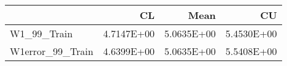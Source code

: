 \begin{tabular}{lrrr}
\toprule
{} &         CL &       Mean &         CU \\
\midrule
W1\_99\_Train      & 4.7147E+00 & 5.0635E+00 & 5.4530E+00 \\
W1error\_99\_Train & 4.6399E+00 & 5.0635E+00 & 5.5408E+00 \\
\bottomrule
\end{tabular}
